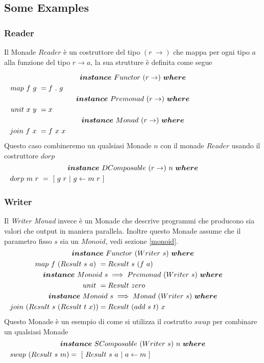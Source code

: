 \pagebreak
\subsection{Some Examples}
\label{some_examples}

\subsubsection*{Reader}
Il Monade $Reader$ è un costruttore del tipo $(r\ \to)$ che mappa per ogni tipo
$a$ alla funzione del tipo $r \to a$, la sua strutture  è definita come segue

\begin{align*}
  \classdef{\bm{instance}\ Functor\ (r \to)\ \bm{where}}
  map\ f\ g\ &= f\ .\ g\\
  \classdef{\bm{instance}\ Premonad\ (r \to)\ \bm{where}}
  unit\ x\ y\ &= x\\
  \classdef{\bm{instance}\ Monad\ (r \to)\ \bm{where}}
  join\ f\ x\ &= f\ x\ x\\
\end{align*}
Questo caso combineremo un qualsiasi Monade $n$ con il monade $Reader$ usando il
costruttore $dorp$
\begin{align*}
  \classdef{\bm{instance}\ DComposable\ (r \to)\ n\ \bm{where}}
  dorp\ m\ r\ &=\ [\ g\ r\ |\ g \leftarrow m\ r\ ]
\end{align*}

\subsubsection*{Writer}
Il \textit{Writer Monad} invece è un Monade che descrive programmi che producono
sia valori che output in maniera parallela.
Inoltre questo Monade assume che il parametro fisso $s$ sia un $Monoid$, vedi
sezione \ref{monoid}.
\begin{align*}
  \classdef{\bm{instance}\ Functor\ (Writer\ s)\ \bm{where}}
  map\ f\ (Result\ s\ a)\ &= Result\ s\ (f\ a)\\
  \classdef{\bm{instance}\ Monoid\ s \implies Premonad\ (Writer\ s)\ \bm{where}}
  unit\ &= Result\ zero\\
  \classdef{\bm{instance}\ Monoid\ s \implies Monad\ (Writer\ s)\ \bm{where}}
  join\ (Result\ s\ (Result\ t\ x)) &= Result\ (add\ s\ t)\ x\\
\end{align*}
Questo Monade è un esempio di come si utilizza il costrutto $swap$ per combinare
un qualsiasi Monade
\begin{align*}
  \classdef{\bm{instance}\ SComposable\ (Writer\ s)\ n\ \bm{where}}
  swap\ (Result\ s\ m) &=\ [\ Result\ s\ a\ |\ a \leftarrow m\ ]
\end{align*}

